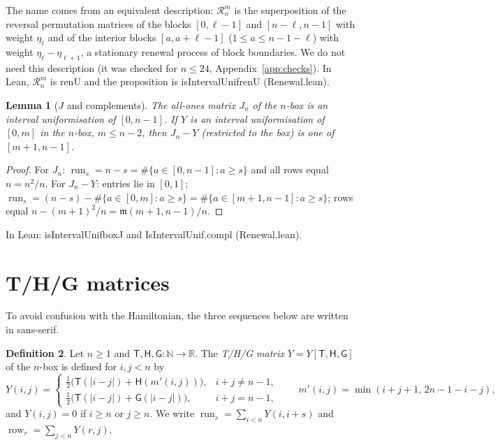\documentclass[11pt]{amsart}
\newtheorem{lemma}{Lemma}[section]
\theoremstyle{definition}
\newtheorem{definition}[lemma]{Definition}
\theoremstyle{remark}
\numberwithin{equation}{section}
\newcommand{\R}{\mathbb{R}}
\newcommand{\N}{\mathbb{N}}
\newcommand{\row}{\operatorname{row}}
\newcommand{\run}{\operatorname{run}}
\newcommand{\sT}{\mathsf{T}}
\newcommand{\sH}{\mathsf{H}}
\newcommand{\sG}{\mathsf{G}}
\newcommand{\cR}{\mathcal{R}}
\newcommand{\ms}{\mathfrak{m}}
\newcommand{\leanus}{\textunderscore\allowbreak}
\newcommand{\lean}[1]{{\ttfamily\let\_\leanus #1}}
\begin{document}
The name comes from an equivalent description: $\cR^m_n$ is the superposition of the reversal
permutation matrices of the blocks $[0,\ell-1]$ and $[n-\ell,n-1]$ with weight $\eta_\ell$ and of the
interior blocks $[a,a+\ell-1]$ ($1\le a\le n-1-\ell$) with weight $\eta_\ell-\eta_{\ell+1}$, a
stationary renewal process of block boundaries. We do not need this description (it was checked for
$n\le24$, Appendix~\ref{app:checks}). In Lean, $\cR^m_n$ is \lean{renU} and the proposition is
\lean{isIntervalUnif\_renU} (\lean{Renewal.lean}).

\begin{lemma}[$J$ and complements]\label{lem:compl}
The all-ones matrix $J_n$ of the $n$-box is an interval uniformisation of $[0,n-1]$. If $Y$ is an
interval uniformisation of $[0,m]$ in the $n$-box, $m\le n-2$, then $J_n-Y$ (restricted to the box) is
one of $[m+1,n-1]$.
\end{lemma}

\begin{proof}
For $J_n$: $\run_s=n-s=\#\{a\in[0,n-1]:a\ge s\}$ and all rows equal $n=n^2/n$. For $J_n-Y$: entries lie in
$[0,1]$; $\run_s=(n-s)-\#\{a\in[0,m]:a\ge s\}=\#\{a\in[m+1,n-1]:a\ge s\}$; rows equal
$n-(m+1)^2/n=\ms(m+1,n-1)/n$.
\end{proof}

In Lean: \lean{isIntervalUnif\_boxJ} and \lean{IsIntervalUnif.compl} (\lean{Renewal.lean}).

\section{T/H/G matrices}\label{sec:thg}

To avoid confusion with the Hamiltonian, the three sequences below are written in sans-serif.

\begin{definition}\label{def:thg}
Let $n\ge1$ and $\sT,\sH,\sG:\N\to\R$. The \emph{T/H/G matrix} $Y=Y[\sT,\sH,\sG]$ of the $n$-box is
defined for $i,j<n$ by
\[
  Y(i,j)=
  \begin{cases}
    \tfrac12\bigl(\sT(|i-j|)+\sH(m'(i,j))\bigr), & i+j\ne n-1,\\[2pt]
    \tfrac12\bigl(\sT(|i-j|)+\sG(|i-j|)\bigr), & i+j=n-1,
  \end{cases}
  \qquad m'(i,j)=\min(i+j+1,\,2n-1-i-j),
\]
and $Y(i,j)=0$ if $i\ge n$ or $j\ge n$. We write $\run_s=\sum_{i<n}Y(i,i+s)$ and
$\row_r=\sum_{j<n}Y(r,j)$.
\end{definition}
\end{document}
